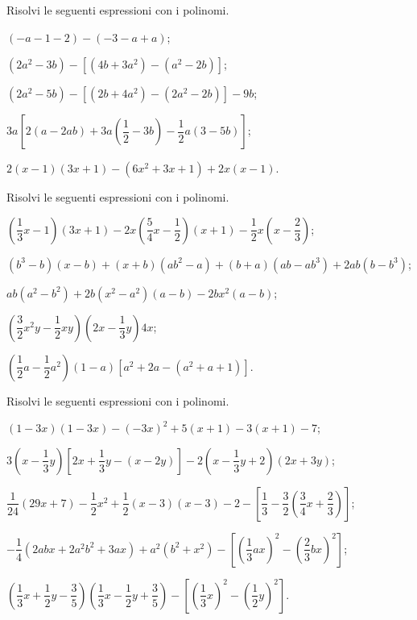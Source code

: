 \begin{esercizio}[\Ast]
\label{ese:11.42}
Risolvi le seguenti espressioni con i polinomi.
 \begin{enumeratea}
 \item $(-a-1-2)-(-3-a+a)$;
 \item $\left(2a^{2}-3b\right)-\left[\left(4b+3a^{2}\right)-\left(a^{2}-2b\right)\right]$;
 \item $\left(2a^{2}-5b\right)-\left[\left(2b+4a^{2}\right)-\left(2a^{2}-2b\right)\right]-9b$;
 \item $3a\left[2(a-2{ab})+3a\left(\dfrac{1}{2}-3b\right)-\dfrac{1}{2}a(3-5b)\right]$;
 \item $2(x-1)(3x+1)-\left(6x^{2}+3x+1\right)+2x(x-1)$.
 \end{enumeratea}
\end{esercizio}
\pagebreak
\begin{esercizio}
\label{ese:11.43}
Risolvi le seguenti espressioni con i polinomi.
 \begin{enumeratea}
 \item $\left(\dfrac{1}{3}x-1\right)(3x+1)-2x\left(\dfrac{5}{4}x-\dfrac{1}{2}\right)(x+1)-\dfrac{1}{2}x\left(x-\dfrac{2}{3}\right)$;
 \item $\left(b^{3}-b\right)(x-b)+(x+b)\left(ab^{2}-a\right)+(b+a)\left(ab-ab^{3}\right)+2ab\left(b-b^{3}\right)$;
 \item $ab\left(a^{2}-b^{2}\right)+2b\left(x^{2}-a^{2}\right)(a-b)-2bx^{2}(a-b)$;
 \item $\left(\dfrac{3}{2}x^{2}y-\dfrac{1}{2}{xy}\right)\left(2x-\dfrac{1}{3}y\right)4x$;
 \item $\left(\dfrac{1}{2}a-\dfrac{1}{2}a^{2}\right)(1-a)\left[a^{2}+2a-\left(a^{2}+a+1\right)\right]$.
 \end{enumeratea}
\end{esercizio}

\begin{esercizio}[\Ast]
\label{ese:11.44}
Risolvi le seguenti espressioni con i polinomi.
 \begin{enumeratea}
 \item $(1-3x)(1-3x)-(-3x)^{2}+5(x+1)-3(x+1)-7$;
 \item $3\left(x-\dfrac{1}{3}y\right)\left[2x+\dfrac{1}{3}y-(x-2y)\right]-2\left(x-\dfrac{1}{3}y+2\right)(2x+3y)$;
 \item $\dfrac{1}{24}(29x+7)-\dfrac{1}{2}x^{2}+\dfrac{1}{2}(x-3)(x-3)-2-\left[\dfrac{1}{3}-\dfrac{3}{2}\left(\dfrac{3}{4}x+\dfrac{2}{3}\right)\right]$;
 \item $-{\dfrac{1}{4}}\left(2 abx+2a^{2}b^{2}+3 ax\right)+a^{2}(b^{2}+x^{2})-\left[\left(\dfrac{1}{3} ax\right)^{2}-\left(\dfrac{2}{3}bx\right)^{2}\right]$;
 \item $\left(\dfrac{1}{3}x+\dfrac{1}{2}y-\dfrac{3}{5}\right)\left(\dfrac{1}{3}x-\dfrac{1}{2}y+\dfrac{3}{5}\right)-\left[\left(\dfrac{1}{3}x\right)^{2}-\left(\dfrac{1}{2}y\right)^{2}\right]$.
 \end{enumeratea}
\end{esercizio}

